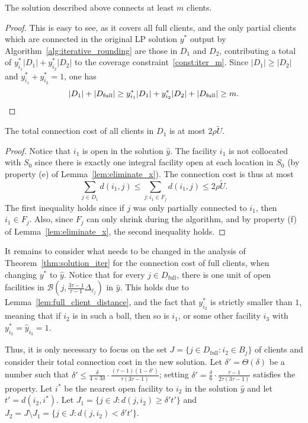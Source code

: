 \begin{lemma} \label{lem:convert_coverage}
The solution described above connects at least $m$ clients.
\end{lemma}

\begin{proof}
This is easy to see, as it covers all full clients, and the only partial clients which are connected in the original LP solution $y^*$ output by Algorithm~\ref{alg:iterative_rounding} are those in $D_1$ and $D_2$, contributing a total of $y^*_{i_1}|D_1| + y^*_{i_2}|D_2|$ to the coverage constraint~\eqref{const:iter_m}. Since $|D_1| \ge |D_2|$ and $y^*_{i_1} + y^*_{i_2} = 1$, one has
\[ |D_1| + |D_\text{full}| \ge y^*_{i_1}|D_1| + y^*_{i_2}|D_2| + |D_\text{full}| \ge m. \qedhere \]
\end{proof}

\begin{lemma} \label{lem:convert_cost_partial}
The total connection cost of all clients in $D_1$ is at most $2\rho\tilde{U}$.
\end{lemma}

\begin{proof}
Notice that $i_1$ is open in the solution $\hat{y}$. The facility $i_1$ is not collocated with $S_0$ since there is exactly one integral facility open at each location in $S_0$ (by property (e) of Lemma~\ref{lem:eliminate_x}). The connection cost is thus at most
\[ \sum_{j \in D_1} d(i_1, j) \le \sum_{j : i_1 \in F_j} d(i_1, j) \le 2\rho\tilde{U}. \]
The first inequality holds since if $j$ was only partially connected to $i_1$, then $i_1 \in F_j$. Also, since $F_j$ can only shrink during the algorithm, and by property (f) of Lemma~\ref{lem:eliminate_x}, the second inequality holds.
\end{proof}

It remains to consider what needs to be changed in the analysis of Theorem~\ref{thm:solution_iter} for the connection cost of full clients, when changing $y^*$ to $\hat{y}$. Notice that for every $j \in D_\text{full}$, there is one unit of open facilities in $\mathcal{B}\left(j, \frac{3\tau-1}{\tau-1}\Delta_{\ell_j}\right)$ in $\hat{y}$. This holds due to Lemma~\ref{lem:full_client_distance}, and the fact that $y^*_{i_2}$ is strictly smaller than $1$, meaning that if $i_2$ is in such a ball, then so is $i_1$, or some other facility $i_3$ with $y^*_{i_3} = \hat{y}_{i_3} = 1$.

Thus, it is only necessary to focus on the set $J = \{j \in D_\text{full} : i_2 \in B_j\}$ of clients and consider their total connection cost in the new solution. Let $\delta' = \Theta(\delta)$ be a number such that $\delta' \le \frac{\delta}{4+3\delta} \cdot \frac{(\tau-1)(1-\delta')}{\tau(3\tau-1)}$; setting $\delta' = \frac{\delta}{6} \cdot \frac{\tau-1}{2\tau(3\tau-1)}$ satisfies the property. Let $i^*$ be the nearest open facility to $i_2$ in the solution $\hat{y}$ and let $t' = d(i_2, i^*)$. Let $J_1 = \{j \in J : d(j, i_2) \ge \delta' t'\}$ and $J_2 = J \setminus J_1 = \{j \in J : d(j, i_2) < \delta' t'\}$.


